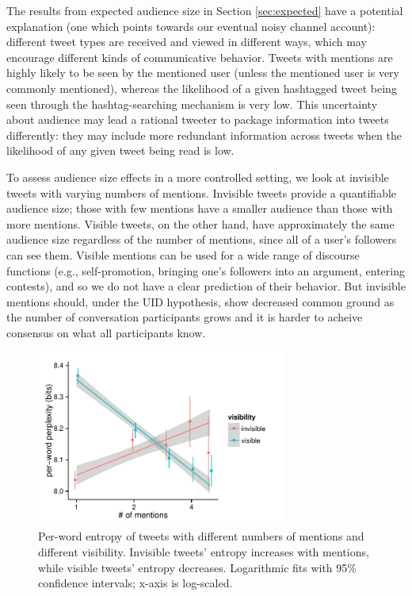 \documentclass[11pt,letterpaper]{article}
\begin{document}
The results from expected audience size in Section \ref{sec:expected} have a potential explanation (one which points towards our eventual noisy channel account): different tweet types are received and viewed in different ways, which may encourage different kinds of communicative behavior.  Tweets with mentions are highly likely to be seen by the mentioned user (unless the mentioned user is very commonly mentioned), whereas the likelihood of a given hashtagged tweet being seen through the hashtag-searching mechanism is very low.  This uncertainty about audience may lead a rational tweeter to package information into tweets differently: they may include more redundant information across tweets when the likelihood of any given tweet being read is low.

To assess audience size effects in a more controlled setting, we look at invisible tweets with varying numbers of mentions.  Invisible tweets provide a quantifiable audience size; those with few mentions have a smaller audience than those with more mentions.  Visible tweets, on the other hand, have approximately the same audience size regardless of the number of mentions, since all of a user's followers can see them. Visible mentions can be used for a wide range of discourse functions (e.g., self-promotion, bringing one's followers into an argument, entering contests), and so we do not have a clear prediction of their behavior. But invisible mentions should, under the UID hypothesis, show decreased common ground as the number of conversation participants grows and it is harder to acheive consensus on what all participants know.

\begin{figure}[t]
 \centering
  \includegraphics[width=3.25in]{figures/cmcl-mentions-pw2.pdf}
 \caption{Per-word entropy of tweets with different numbers of mentions and different visibility.  Invisible tweets' entropy increases with mentions, while visible tweets' entropy decreases. Logarithmic fits with 95\% confidence intervals; x-axis is log-scaled.}\label{fig:mentions}\vspace*{-.5em}
\end{figure}
\end{document}
